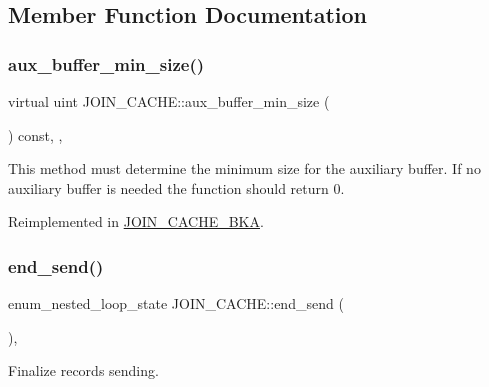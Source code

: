 \subsection{Member Function Documentation}
\mbox{\label{classJOIN__CACHE_a22f1df0156fa6d176df6d6e6d4b84916}} 
\subsubsection{\texorpdfstring{aux\+\_\+buffer\+\_\+min\+\_\+size()}{aux\_buffer\_min\_size()}}
{\footnotesize\ttfamily virtual uint J\+O\+I\+N\+\_\+\+C\+A\+C\+H\+E\+::aux\+\_\+buffer\+\_\+min\+\_\+size (\begin{DoxyParamCaption}{ }\end{DoxyParamCaption}) const\hspace{0.3cm}{\ttfamily [inline]}, {\ttfamily [protected]}, {\ttfamily [virtual]}}

This method must determine the minimum size for the auxiliary buffer. If no auxiliary buffer is needed the function should return 0. 

Reimplemented in \mbox{\hyperlink{group__Query__Optimizer_gaef7343f0416360c14c6134867b347c83}{J\+O\+I\+N\+\_\+\+C\+A\+C\+H\+E\+\_\+\+B\+KA}}.

\mbox{\label{classJOIN__CACHE_a1c3046624063d752fe21c895e13a00c9}} 
\subsubsection{\texorpdfstring{end\+\_\+send()}{end\_send()}}
{\footnotesize\ttfamily enum\+\_\+nested\+\_\+loop\+\_\+state J\+O\+I\+N\+\_\+\+C\+A\+C\+H\+E\+::end\+\_\+send (\begin{DoxyParamCaption}{ }\end{DoxyParamCaption})\hspace{0.3cm}{\ttfamily [inline]}, {\ttfamily [virtual]}}

Finalize records sending. 

